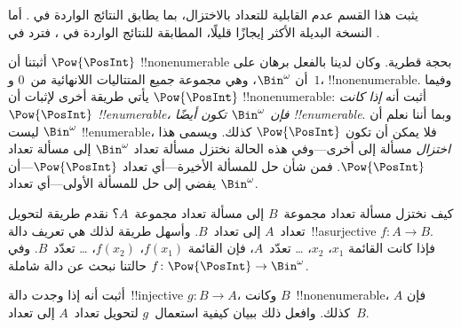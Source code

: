 \documentclass[../../../include/open-logic-section]{subfiles}
\begin{document}


\begin{editorial}
  يثبت هذا القسم عدم القابلية للتعداد بالاختزال، بما يطابق النتائج
  الواردة في . أما النسخة البديلة الأكثر إيجازًا
  قليلًا، المطابقة للنتائج الواردة في ، فترد في
  .
\end{editorial}

أثبتنا أن $\Pow{\PosInt}$ !!{nonenumerable} بحجة قطرية. وكان لدينا
بالفعل برهان على أن $\Bin^\omega$، وهي مجموعة جميع المتتاليات
اللانهائية من~$0$ و~$1$، !!{nonenumerable}. وفيما يأتي طريقة أخرى
لإثبات أن $\Pow{\PosInt}$ !!{nonenumerable}: أثبت أنه \emph{إذا كانت
  $\Pow{\PosInt}$ !!{enumerable}، فإن $\Bin^\omega$ تكون أيضًا
  !!{enumerable}}. وبما أننا نعلم أن $\Bin^\omega$ ليست
!!{enumerable}، فلا يمكن أن تكون $\Pow{\PosInt}$ كذلك. ويسمى هذا
\emph{اختزال} مسألة إلى أخرى---وفي هذه الحالة نختزل مسألة تعداد
$\Bin^\omega$ إلى مسألة تعداد $\Pow{\PosInt}$. فمن شأن حل للمسألة
الأخيرة---أي تعداد $\Pow{\PosInt}$---أن يفضي إلى حل للمسألة
الأولى---أي تعداد $\Bin^\omega$.

كيف نختزل مسألة تعداد مجموعة~$B$ إلى مسألة تعداد مجموعة~$A$؟ نقدم
طريقة لتحويل تعداد~$A$ إلى تعداد~$B$. وأسهل طريقة لذلك هي تعريف
دالة~!!a{surjective} $f\colon A \to B$. فإذا كانت القائمة $x_1$، $x_2$،
\dots{} تعدّد~$A$، فإن القائمة $f(x_1)$، $f(x_2)$، \dots{} تعدّد~$B$.
وفي حالتنا نبحث عن دالة شاملة
$f\colon \Pow{\PosInt} \to \Bin^\omega$.

\begin{prob}
أثبت أنه إذا وجدت دالة~!!{injective} $g\colon B \to A$، وكانت
$B$~!!{nonenumerable}، فإن $A$ كذلك. وافعل ذلك ببيان كيفية استعمال~$g$
لتحويل تعداد~$A$ إلى تعداد~$B$.
\end{prob}
\end{document}
